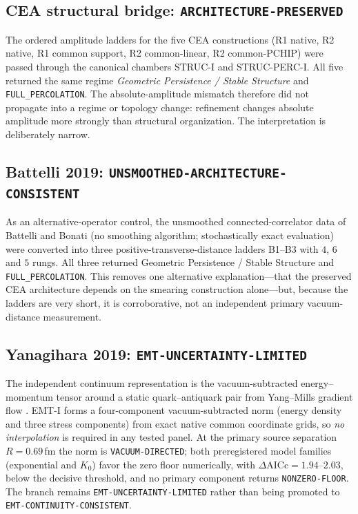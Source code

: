 \documentclass[11pt,a4paper]{article}
\theoremstyle{definition}
\theoremstyle{remark}
\begin{document}
\subsection{CEA structural bridge: \texttt{ARCHITECTURE-\allowbreak{}PRESERVED}}
The ordered amplitude ladders for the five CEA constructions (R1 native, R2 native, R1 common support, R2 common-linear, R2 common-PCHIP) were passed through the canonical chambers STRUC-I and STRUC-PERC-I. All five returned the same regime \emph{Geometric Persistence / Stable Structure} and \texttt{FULL\_PERCOLATION}. The absolute-amplitude mismatch therefore did not propagate into a regime or topology change: refinement changes absolute amplitude more strongly than structural organization. The interpretation is deliberately narrow.

\subsection{Battelli 2019: \texttt{UNSMOOTHED-\allowbreak{}ARCHITECTURE-\allowbreak{}CONSISTENT}}
As an alternative-operator control, the unsmoothed connected-correlator data of Battelli and Bonati \cite{Battelli19} (no smoothing algorithm; stochastically exact evaluation) were converted into three positive-transverse-distance ladders B1--B3 with $4$, $6$ and $5$ rungs. All three returned Geometric Persistence / Stable Structure and \texttt{FULL\_PERCOLATION}. This removes one alternative explanation---that the preserved CEA architecture depends on the smearing construction alone---but, because the ladders are very short, it is corroborative, not an independent primary vacuum-distance measurement.

\subsection{Yanagihara 2019: \texttt{EMT-\allowbreak{}UNCERTAINTY-\allowbreak{}LIMITED}}
The independent continuum representation is the vacuum-subtracted energy--momentum tensor around a static quark--antiquark pair from Yang--Mills gradient flow \cite{Yanagihara19}. EMT-I forms a four-component vacuum-subtracted norm (energy density and three stress components) from exact native common coordinate grids, so \emph{no interpolation} is required in any tested panel. At the primary source separation $R=0.69$\,fm the norm is \texttt{VACUUM-\allowbreak{}DIRECTED}; both preregistered model families (exponential and $K_0$) favor the zero floor numerically, with $\Delta\mathrm{AICc}=1.94$--$2.03$, below the decisive threshold, and no primary component returns \texttt{NONZERO-\allowbreak{}FLOOR}. The branch remains \texttt{EMT-\allowbreak{}UNCERTAINTY-\allowbreak{}LIMITED} rather than being promoted to \texttt{EMT-\allowbreak{}CONTINUITY-\allowbreak{}CONSISTENT}.
\end{document}

